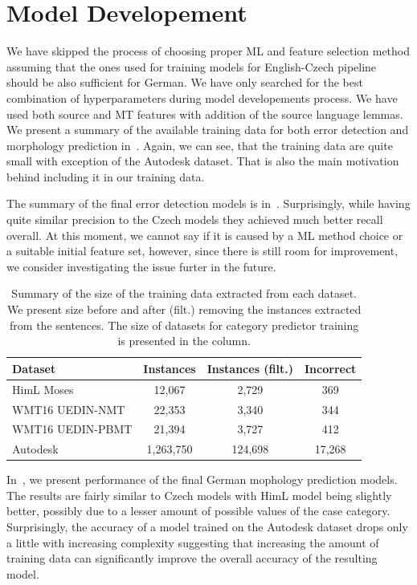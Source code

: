 \section{Model Developement}

We have skipped the process of choosing proper ML and feature selection method
assuming that the ones used for training models for English-Czech pipeline should
be also sufficient for German. We have only searched for the best combination
of hyperparameters during model developements process. We have used both source
and MT features with addition of the source language lemmas. We present a summary
of the available training data for both error detection and morphology prediction in~.
Again, we can see, that the training data are quite small with exception of the Autodesk
dataset. That is also the main motivation behind including it in our training data.

The summary of the final error detection models is in~. Surprisingly,
while having quite similar precision to the Czech models they achieved much better
recall overall. At this moment, we cannot say if it is caused by a ML method choice or a suitable
initial feature set, however, since there is still room for improvement, we consider investigating
the issue furter in the future.

\begin{table}[t]
\centering
\small

\begin{tabular}{lccc}
Dataset  &  \hash{} Instances  &  \hash{} Instances (filt.)  &  \hash{} Incorrect  \\
\hline
HimL Moses  & 12,067  &  2,729  &  369  \\
WMT16 UEDIN-NMT  &  22,353  &  3,340  &  344  \\
WMT16 UEDIN-PBMT  &  21,394  &   3,727  &  412  \\
Autodesk  &  1,263,750  &  124,698  &  17,268  \\
\end{tabular}
\caption{
    Summary of the size of the training data extracted from each dataset. We present
size before and after (filt.) removing the instances extracted from the  sentences.
The size of datasets for category predictor training is presented in the  column.
}
\label{wf-cat-data-sum}
\end{table}

In~, we present performance of the final German
mophology prediction models. The results are fairly similar to Czech models with
HimL model being slightly better, possibly due to a lesser amount of possible values
of the case category. Surprisingly, the accuracy of  a model trained on the Autodesk
dataset drops only a little with increasing complexity suggesting that increasing
the amount of training data can significantly improve the overall accuracy of the
resulting model.

